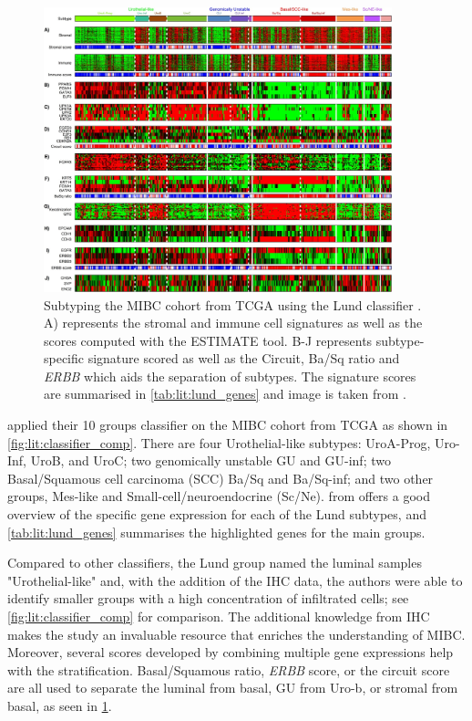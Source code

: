 \begin{figure}[!t]   
\centering
\includegraphics[width=0.9\textwidth,height=0.9\textheight,keepaspectratio]{Sections/Lit_review/Resources/Lung_subtypes.jpg}
  \caption{Subtyping the MIBC cohort from TCGA using the Lund classifier \cite{Marzouka2018-ge}. A) represents the stromal and immune cell signatures as well as the scores computed with the ESTIMATE tool\cite{Yoshihara2013-wq}. B-J represents subtype-specific signature scored as well as the Circuit, Ba/Sq ratio and \textit{ERBB} which aids the separation of subtypes. The signature scores are summarised in \cref{tab:lit:lund_genes} and image is taken from \cite{Marzouka2018-ge}.
}
\label{fig:lit:lund_fig}
\end{figure}
\FloatBarrier

\citet{Marzouka2018-ge} applied their 10 groups classifier on the MIBC cohort from TCGA as shown in \cref{fig:lit:classifier_comp}. There are four Urothelial-like subtypes: UroA-Prog, Uro-Inf, UroB, and UroC; two genomically unstable GU and GU-inf; two Basal/Squamous cell carcinoma (SCC) Ba/Sq and Ba/Sq-inf; and two other groups, Mes-like and Small-cell/neuroendocrine (Sc/Ne).  from \citet{Marzouka2018-ge} offers a good overview of the specific gene expression for each of the Lund subtypes, and \cref{tab:lit:lund_genes} summarises the highlighted genes for the main groups.


Compared to other classifiers, the Lund group named the luminal samples "Urothelial-like" and, with the addition of the IHC data, the authors were able to identify smaller groups with a high concentration of infiltrated cells; see \cref{fig:lit:classifier_comp} for comparison. The additional knowledge from IHC makes the study an invaluable resource that enriches the understanding of MIBC. Moreover, several scores developed by combining multiple gene expressions help with the stratification. Basal/Squamous ratio, \textit{ERBB} score, or the circuit score are all used to separate the luminal from basal, GU from Uro-b, or stromal from basal, as seen in \cref{fig:lit:lund_fig}. 

